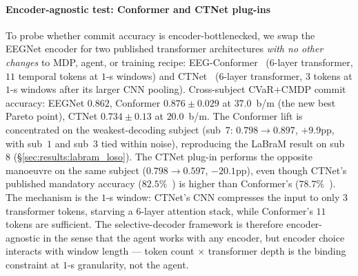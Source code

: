 \paragraph*{Encoder-agnostic test: Conformer and CTNet plug-ins}
To probe whether commit accuracy is encoder-bottlenecked, we
swap the EEGNet encoder for two published transformer
architectures \emph{with no other changes} to MDP, agent, or
training recipe: EEG-Conformer~\cite{Song2023Conformer}
($6$-layer transformer, $11$ temporal tokens at $1$-s windows)
and CTNet~\cite{Zhao2024CTNet} ($6$-layer transformer,
$3$ tokens at $1$-s windows after its larger CNN pooling).
Cross-subject CVaR+CMDP commit accuracy: EEGNet $0.862$,
Conformer $\mathbf{0.876\!\pm\!0.029}$ at $\mathbf{37.0}$~b/m
(the new best Pareto point), CTNet $0.734\!\pm\!0.13$ at
$20.0$~b/m. The Conformer lift is concentrated on the
weakest-decoding subject (sub~$7$: $0.798 \to 0.897$, $+9.9$pp,
with sub~$1$ and sub~$3$ tied within noise), reproducing the
LaBraM result on \bcib{} sub~$8$
(\S\ref{sec:results:labram_loso}). The CTNet plug-in performs
the opposite manoeuvre on the same subject ($0.798 \to 0.597$,
$-20.1$pp), even though CTNet's published mandatory accuracy
($82.5\%$~\cite{Zhao2024CTNet}) is higher than Conformer's
($78.7\%$~\cite{Song2023Conformer}). The mechanism is the
$1$-s window: CTNet's CNN compresses the input to only $3$
transformer tokens, starving a $6$-layer attention stack, while
Conformer's $11$ tokens are sufficient. The selective-decoder
framework is therefore encoder-agnostic in the sense that the
agent works with any encoder, but encoder choice interacts with
window length --- token count $\times$ transformer depth is the
binding constraint at $1$-s granularity, not the agent.

